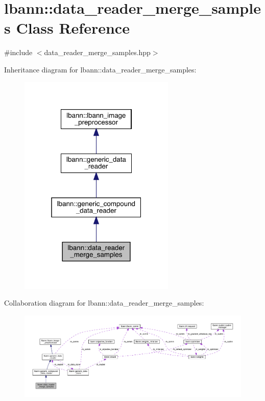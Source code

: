 \hypertarget{classlbann_1_1data__reader__merge__samples}{}\section{lbann\+:\+:data\+\_\+reader\+\_\+merge\+\_\+samples Class Reference}
\label{classlbann_1_1data__reader__merge__samples}


{\ttfamily \#include $<$data\+\_\+reader\+\_\+merge\+\_\+samples.\+hpp$>$}



Inheritance diagram for lbann\+:\+:data\+\_\+reader\+\_\+merge\+\_\+samples\+:\nopagebreak
\begin{figure}[H]
\begin{center}
\leavevmode
\includegraphics[width=211pt]{classlbann_1_1data__reader__merge__samples__inherit__graph}
\end{center}
\end{figure}


Collaboration diagram for lbann\+:\+:data\+\_\+reader\+\_\+merge\+\_\+samples\+:\nopagebreak
\begin{figure}[H]
\begin{center}
\leavevmode
\includegraphics[width=350pt]{classlbann_1_1data__reader__merge__samples__coll__graph}
\end{center}
\end{figure}
